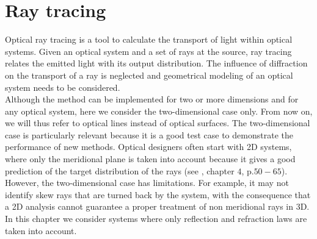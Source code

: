 \chapter{Ray tracing}\label{chap:raytracing}
Optical ray tracing is a tool to calculate the transport of light within optical systems.
Given an optical system and a set of rays at the source, ray tracing relates the emitted light with its output distribution. 
The influence of diffraction on the transport of a ray is neglected and geometrical modeling of an optical system needs to be considered. \\ \indent
Although the method can be implemented for two or more dimensions and for any optical system, here we consider the two-dimensional case only. 
From now on, we will thus refer to optical lines instead of optical surfaces.
The two-dimensional case is particularly relevant because it is a good test case to demonstrate the performance of new methods.
Optical designers often start with 2D systems, where only the meridional plane is taken into account because it gives a good prediction of the target distribution of the rays
(see \cite{winston2005nonimaging}, chapter $4$, p.$50-65$). However, the two-dimensional case has limitations. For example, it may not identify skew rays that are turned back by the system, with the consequence that a 2D analysis cannot guarantee a proper treatment of non meridional rays in 3D.\\ \indent
In this chapter we consider systems where only reflection and refraction laws are taken into account.
